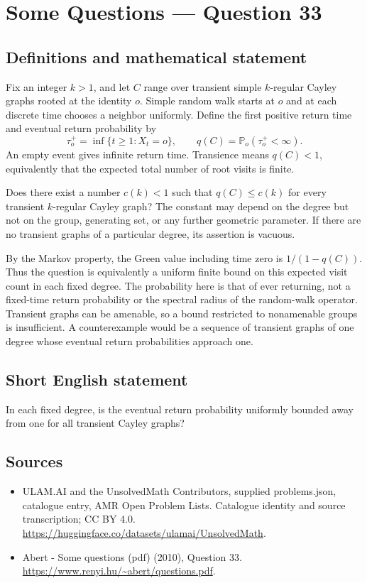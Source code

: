 \documentclass[11pt,a4paper]{article}
\begin{document}
\section*{Some Questions — Question 33}\label{statement}

\subsection{Definitions and mathematical statement}
Fix an integer $k>1$, and let $C$ range over transient simple $k$-regular Cayley graphs rooted at the identity $o$. Simple random walk starts at $o$ and at each discrete time chooses a neighbor uniformly. Define the first positive return time and eventual return probability by
\[
 \tau_o^+=\inf\{t\geq1:X_t=o\},\qquad
 q(C)=\mathbb P_o(\tau_o^+<\infty).
\]
An empty event gives infinite return time. Transience means $q(C)<1$, equivalently that the expected total number of root visits is finite.

Does there exist a number $c(k)<1$ such that $q(C)\leq c(k)$ for every transient $k$-regular Cayley graph? The constant may depend on the degree but not on the group, generating set, or any further geometric parameter. If there are no transient graphs of a particular degree, its assertion is vacuous.

By the Markov property, the Green value including time zero is $1/(1-q(C))$. Thus the question is equivalently a uniform finite bound on this expected visit count in each fixed degree. The probability here is that of ever returning, not a fixed-time return probability or the spectral radius of the random-walk operator. Transient graphs can be amenable, so a bound restricted to nonamenable groups is insufficient. A counterexample would be a sequence of transient graphs of one degree whose eventual return probabilities approach one.
\subsection{Short English statement}
In each fixed degree, is the eventual return probability uniformly bounded away from one for all transient Cayley graphs?
\subsection{Sources}
\begin{itemize}
\item[S1] ULAM.AI and the UnsolvedMath Contributors, supplied problems.json, catalogue entry, AMR Open Problem Lists. Catalogue identity and source transcription; CC BY 4.0.
\url{https://huggingface.co/datasets/ulamai/UnsolvedMath}.
\item[S2] Abert - Some questions (pdf) (2010), Question 33. 
\url{https://www.renyi.hu/~abert/questions.pdf}.
\end{itemize}
\end{document}
